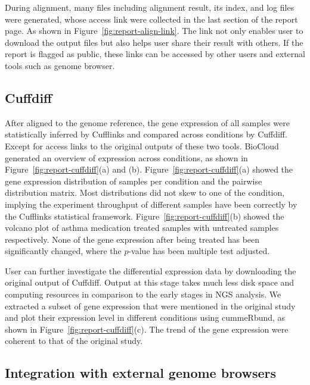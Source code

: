 

During alignment, many files including alignment result, its index, and log
files were generated,  whose access link were collected in the last section of
the report page. As shown in Figure~\ref{fig:report-align-link}. The link not
only enables user to download the output files but also helps user share their
result with others. If the report is flagged as public, these links can be
accessed by other users and external tools such as genome browser.




\subsection{Cuffdiff}



After aligned to the genome reference, the gene expression of all samples were
statistically inferred by Cufflinks and compared across conditions by Cuffdiff.
Except for access links to the original outputs of these two tools. BioCloud
generated an overview of expression across conditions, as shown in
Figure~\ref{fig:report-cuffdiff}(a) and (b).
Figure~\ref{fig:report-cuffdiff}(a) showed the gene expression distribution of
samples per condition and the pairwise distribution matrix. Most distributions
did not skew to one of the condition, implying the experiment throughput of
different samples have been correctly by the Cufflinks statistical framework.
Figure~\ref{fig:report-cuffdiff}(b) showed the volcano plot of asthma
medication treated samples with untreated samples respectively. None of the
gene expression after being treated has been significantly changed, where the
$p$-value has been multiple test adjusted.

User can further investigate the differential expression data by downloading
the original output of Cuffdiff. Output at this stage takes much less disk
space and computing resources in comparison to the early stages in NGS
analysis. We extracted a subset of gene expression that were mentioned in the
original study \cite{himes2014:rnaseq} and plot their expression level in
different conditions using cummeRbund, as shown in
Figure~\ref{fig:report-cuffdiff}(c). The trend of the gene expression were
coherent to that of the original study.



\subsection{Integration with external genome browsers}

